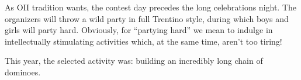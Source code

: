 \usepackage{xcolor}
\usepackage{afterpage}
\usepackage{pifont,mdframed}
\usepackage[bottom]{footmisc}



\renewcommand{\inputfile}{\texttt{stdin}}
\renewcommand{\outputfile}{\texttt{stdout}}
\makeatletter
\renewcommand{\this@inputfilename}{\texttt{stdin}}
\renewcommand{\this@outputfilename}{\texttt{stdout}}
\makeatother

\newenvironment{warning}
  {\par\begin{mdframed}[linewidth=2pt,linecolor=gray]%
    \begin{list}{}{\leftmargin=1cm
                   \labelwidth=\leftmargin}\item[\Large\ding{43}]}
  {\end{list}\end{mdframed}\par}

\newenvironment{todoenv}
{\par\begin{mdframed}[linewidth=2pt,linecolor=red]%
		\begin{list}{}{\leftmargin=1cm
				\labelwidth=\leftmargin}\item[\Large\ding{169}]}
		{\end{list}\end{mdframed}\par}

\newcommand{\todo}[1]{\begin{todoenv}
		TODO: #1
\end{todoenv}}



As OII tradition wants, the contest day precedes the long celebrations night. The organizers will throw a wild party in full Trentino style, during which boys and girls will party hard. Obviously, for ``partying hard'' we mean to indulge in intellectually stimulating activities which, at the same time, aren't too tiring!

This year, the selected activity was: building an incredibly long chain of dominoes.

